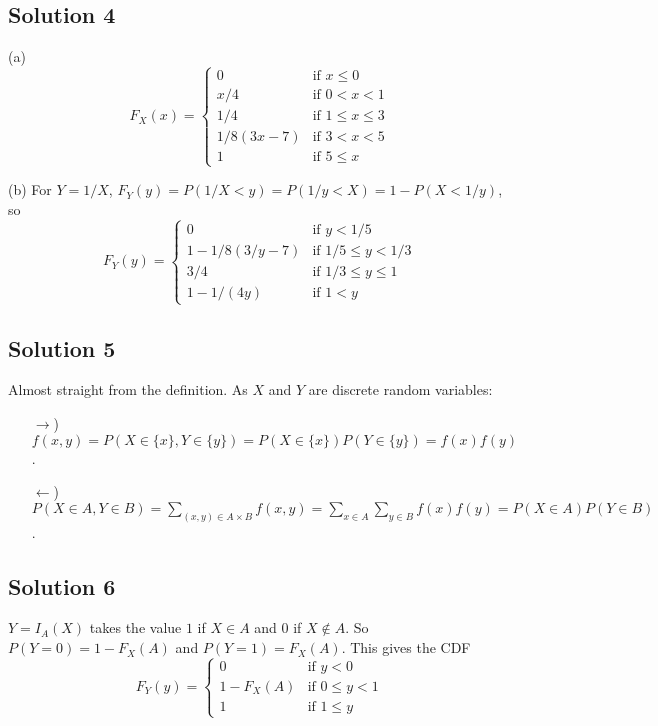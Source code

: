\subsection*{Solution 4}

(a)
$$
F_X(x) = \left\{ \begin{array}{ll}
    0 & \text{if } x \leq 0 \\
    x/4 & \text{if } 0 < x < 1 \\
    1/4 & \text{if } 1 \leq x \leq 3 \\
    1/8(3x - 7) & \text{if } 3 < x < 5 \\
    1 & \text{if } 5 \leq x
\end{array} \right.
$$

(b) For $Y = 1/X$, $F_Y(y) = P(1/X < y) = P(1/y < X) = 1 - P(X < 1/y)$, so
$$
F_Y(y) = \left\{ \begin{array}{ll}
    0 & \text{if } y < 1/5 \\
    1 - 1/8(3/y - 7) & \text{if } 1/5 \leq y < 1/3 \\
    3/4 & \text{if } 1/3 \leq y \leq 1 \\
    1 - 1/(4y) & \text{if } 1 < y
\end{array} \right.
$$


\subsection*{Solution 5}

Almost straight from the definition.
As $X$ and $Y$ are discrete random variables:
\begin{itemize}
\item[$\rightarrow$)] $f(x, y) = P(X \in \{x\}, Y \in \{y\}) = P(X \in \{x\})P(Y \in \{y\}) = f(x)f(y)$.
\item[$\leftarrow$)] $P(X \in A, Y \in B) = \sum_{(x, y) \in A \times B} f(x, y) = \sum_{x \in A} \sum_{y \in B} f(x) f(y) = P(X \in A) P(Y \in B)$.
\end{itemize}


\subsection*{Solution 6}

$Y = I_A(X)$ takes the value $1$ if $X \in A$ and $0$ if $X \notin A$.
So $P(Y = 0) = 1 - F_X(A)$ and $P(Y = 1) = F_X(A)$.
This gives the CDF
$$
F_Y(y) = \left\{ \begin{array}{ll}
    0 & \text{if } y < 0 \\
    1 - F_X(A) & \text{if } 0 \leq y < 1 \\
    1 & \text{if } 1 \leq y
\end{array} \right.
$$


